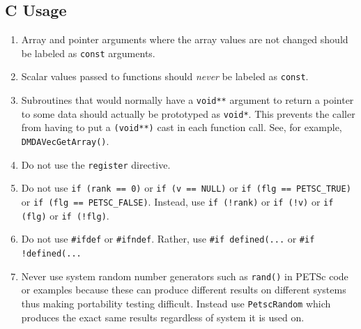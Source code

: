 \subsection{C Usage}
\begin{enumerate}
\item Array and pointer arguments where the array values are not changed should be labeled as \lstinline{const} arguments.
\item Scalar values passed to functions should {\em never} be labeled as \lstinline{const}.
\item Subroutines that would normally have a \lstinline{void**} argument to return a pointer to some data should
actually be prototyped as \lstinline{void*}. This prevents the caller from having to put a \lstinline{(void**)} cast in each function call. See, for example, \lstinline{DMDAVecGetArray()}.
\item Do not use the \lstinline{register} directive.
\item Do not use \lstinline{if (rank == 0)} or \lstinline{if (v == NULL)} or \lstinline{if (flg == PETSC_TRUE)} or \lstinline{if (flg == PETSC_FALSE)}.
Instead, use \lstinline{if (!rank)} or \lstinline{if (!v)} or \lstinline{if (flg)} or \lstinline{if (!flg)}.
\item Do not use \lstinline{#ifdef} or \lstinline{#ifndef}. Rather, use \lstinline{#if defined(...} or \lstinline{#if !defined(...}
\item Never use system random number generators such as \lstinline{rand()} in PETSc code or examples because these can produce different results
on different systems thus making portability testing difficult. Instead use \lstinline{PetscRandom} which produces the exact same results regardless of
system it is used on.
\end{enumerate}

